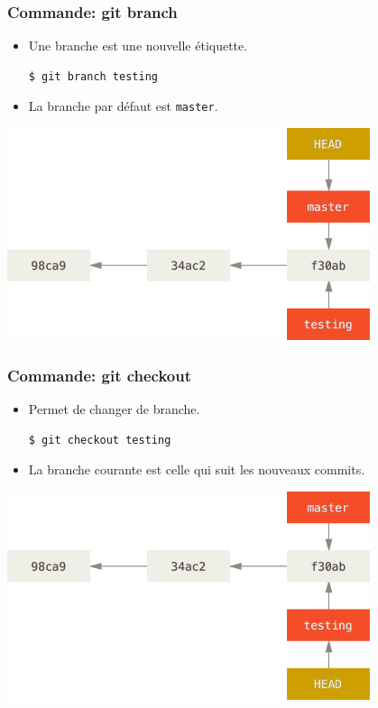 \documentclass{beamer}
\begin{document}
\begin{frame}[fragile]
    \frametitle{Commande: git branch}
    \begin{itemize}
        \item Une branche est une nouvelle étiquette.
\begin{lstlisting}
$ git branch testing
\end{lstlisting}
        \item La branche par défaut est \texttt{master}.
    \end{itemize}
    \begin{center}
        \includegraphics[width=0.8\textwidth]{img/head-to-master.png}
    \end{center}
\end{frame}

\begin{frame}[fragile]
    \frametitle{Commande: git checkout}
    \begin{itemize}
        \item Permet de changer de branche.
\begin{lstlisting}
$ git checkout testing
\end{lstlisting}
        \item La branche courante est celle qui suit les nouveaux commits.
    \end{itemize}
    \begin{center}
        \includegraphics[width=0.8\textwidth]{img/head-to-testing.png}
    \end{center}
\end{frame}
\end{document}
